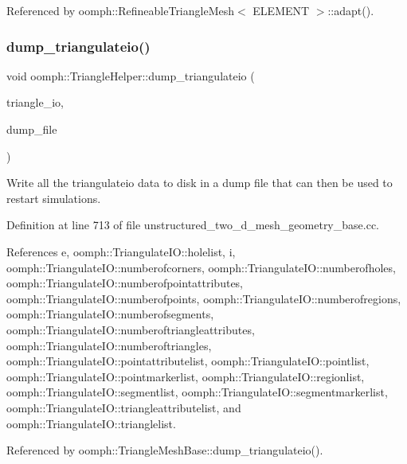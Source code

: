 Referenced by oomph\+::\+Refineable\+Triangle\+Mesh$<$ E\+L\+E\+M\+E\+N\+T $>$\+::adapt().

\mbox{\label{namespaceoomph_1_1TriangleHelper_a86bf54d4c238d866b9cbec1377e868bd}} 
\subsubsection{\texorpdfstring{dump\+\_\+triangulateio()}{dump\_triangulateio()}}
{\footnotesize\ttfamily void oomph\+::\+Triangle\+Helper\+::dump\+\_\+triangulateio (\begin{DoxyParamCaption}\item[{\hyperlink{structoomph_1_1TriangulateIO}{Triangulate\+IO} \&}]{triangle\+\_\+io,  }\item[{std\+::ostream \&}]{dump\+\_\+file }\end{DoxyParamCaption})}



Write all the triangulateio data to disk in a dump file that can then be used to restart simulations. 



Definition at line 713 of file unstructured\+\_\+two\+\_\+d\+\_\+mesh\+\_\+geometry\+\_\+base.\+cc.



References e, oomph\+::\+Triangulate\+I\+O\+::holelist, i, oomph\+::\+Triangulate\+I\+O\+::numberofcorners, oomph\+::\+Triangulate\+I\+O\+::numberofholes, oomph\+::\+Triangulate\+I\+O\+::numberofpointattributes, oomph\+::\+Triangulate\+I\+O\+::numberofpoints, oomph\+::\+Triangulate\+I\+O\+::numberofregions, oomph\+::\+Triangulate\+I\+O\+::numberofsegments, oomph\+::\+Triangulate\+I\+O\+::numberoftriangleattributes, oomph\+::\+Triangulate\+I\+O\+::numberoftriangles, oomph\+::\+Triangulate\+I\+O\+::pointattributelist, oomph\+::\+Triangulate\+I\+O\+::pointlist, oomph\+::\+Triangulate\+I\+O\+::pointmarkerlist, oomph\+::\+Triangulate\+I\+O\+::regionlist, oomph\+::\+Triangulate\+I\+O\+::segmentlist, oomph\+::\+Triangulate\+I\+O\+::segmentmarkerlist, oomph\+::\+Triangulate\+I\+O\+::triangleattributelist, and oomph\+::\+Triangulate\+I\+O\+::trianglelist.



Referenced by oomph\+::\+Triangle\+Mesh\+Base\+::dump\+\_\+triangulateio().

